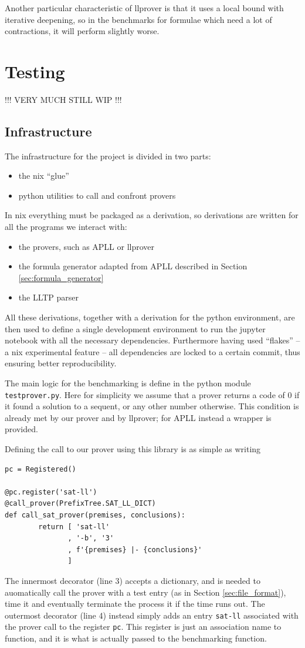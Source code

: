 \documentclass[a4paper, 12pt, english]{report}
\begin{document}
Another particular characteristic of llprover is that it uses a local bound with iterative deepening, so in the benchmarks for formulae which need a lot of contractions, it will perform slightly worse.

\chapter{Testing}
!!! VERY MUCH STILL WIP !!!
\section{Infrastructure}
The infrastructure for the project is divided in two parts:
\begin{itemize}
	\item the nix ``glue''
	\item python utilities to call and confront provers
\end{itemize}
In nix everything must be packaged as a derivation, so derivations are written for all the programs we interact with:
\begin{itemize}
	\item the provers, such as APLL or llprover
	\item the formula generator adapted from APLL described in Section \ref{sec:formula_generator}
	\item the LLTP parser
\end{itemize}
All these derivations, together with a derivation for the python environment, are then used to define a single development environment to run the jupyter notebook with all the necessary dependencies.
Furthermore having used ``flakes'' -- a nix experimental feature -- all dependencies are locked to a certain commit, thus ensuring better reproducibility.

The main logic for the benchmarking is define in the python module \texttt{testprover.py}.
Here for simplicity we assume that a prover returns a code of 0 if it found a solution to a sequent, or any other number otherwise.
This condition is already met by our prover and by llprover; for APLL instead a wrapper is provided.

Defining the call to our prover using this library is as simple as writing
\begin{verbatim}
pc = Registered()

@pc.register('sat-ll')
@call_prover(PrefixTree.SAT_LL_DICT)
def call_sat_prover(premises, conclusions):
        return [ 'sat-ll'
               , '-b', '3'
               , f'{premises} |- {conclusions}'
               ]
\end{verbatim}
The innermost decorator (line 3) accepts a dictionary, and is needed to auomatically call the prover with a test entry (as in Section \ref{sec:file_format}), time it and eventually terminate the process it if the time runs out.
The outermost decorator (line 4) instead simply adds an entry \texttt{sat-ll} associated with the prover call to the register \texttt{pc}.
This register is just an association name to function, and it is what is actually passed to the benchmarking function.
\end{document}
